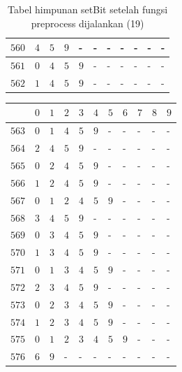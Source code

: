 \begin{appendices}
\begin{table}[H]
\begin{tabular} {|l|l|l|l|l|l|l|l|l|l|l|}
  		$ 560 $ & $ 4 $ &$ 5 $ &$ 9 $ & - &  - &  - &  - &  - &  - &  -   \\ \hline
  		$ 561 $ & $ 0 $ &$ 4 $ &$ 5 $ &$ 9 $ & - &  - &  - &  - &  - &  -   \\ \hline
  		$ 562 $ & $ 1 $ &$ 4 $ &$ 5 $ &$ 9 $ & - &  - &  - &  - &  - &  -   \\ \hline  		
  	\end{tabular}\caption{Tabel himpunan setBit setelah fungsi preprocess dijalankan (19)}
  	\label{tab:setbit_19}
  \end{table}
  \begin{table}[H]
  	\centering
  	\begin{tabular} {|l|l|l|l|l|l|l|l|l|l|l|} \hline
  		\backslashbox{$Num$}{$index$} & $ 0 $ & $ 1 $ & $ 2 $ & $ 3 $ & $ 4 $ & $ 5 $ & $ 6 $ & $ 7 $ & $ 8 $ & $ 9 $ \\ \hline
  		$ 563 $ & $ 0 $ &$ 1 $ &$ 4 $ &$ 5 $ &$ 9 $ & - &  - &  - &  - &  -   \\ \hline
  		$ 564 $ & $ 2 $ &$ 4 $ &$ 5 $ &$ 9 $ & - &  - &  - &  - &  - &  -   \\ \hline
  		$ 565 $ & $ 0 $ &$ 2 $ &$ 4 $ &$ 5 $ &$ 9 $ & - &  - &  - &  - &  -   \\ \hline
  		$ 566 $ & $ 1 $ &$ 2 $ &$ 4 $ &$ 5 $ &$ 9 $ & - &  - &  - &  - &  -   \\ \hline
  		$ 567 $ & $ 0 $ &$ 1 $ &$ 2 $ &$ 4 $ &$ 5 $ &$ 9 $ & - &  - &  - &  -   \\ \hline
  		$ 568 $ & $ 3 $ &$ 4 $ &$ 5 $ &$ 9 $ & - &  - &  - &  - &  - &  -   \\ \hline
  		$ 569 $ & $ 0 $ &$ 3 $ &$ 4 $ &$ 5 $ &$ 9 $ & - &  - &  - &  - &  -   \\ \hline
  		$ 570 $ & $ 1 $ &$ 3 $ &$ 4 $ &$ 5 $ &$ 9 $ & - &  - &  - &  - &  -   \\ \hline
  		$ 571 $ & $ 0 $ &$ 1 $ &$ 3 $ &$ 4 $ &$ 5 $ &$ 9 $ & - &  - &  - &  -   \\ \hline
  		$ 572 $ & $ 2 $ &$ 3 $ &$ 4 $ &$ 5 $ &$ 9 $ & - &  - &  - &  - &  -   \\ \hline
  		$ 573 $ & $ 0 $ &$ 2 $ &$ 3 $ &$ 4 $ &$ 5 $ &$ 9 $ & - &  - &  - &  -   \\ \hline
  		$ 574 $ & $ 1 $ &$ 2 $ &$ 3 $ &$ 4 $ &$ 5 $ &$ 9 $ & - &  - &  - &  -   \\ \hline
  		$ 575 $ & $ 0 $ &$ 1 $ &$ 2 $ &$ 3 $ &$ 4 $ &$ 5 $ &$ 9 $ & - &  - &  -   \\ \hline
  		$ 576 $ & $ 6 $ &$ 9 $ & - &  - &  - &  - &  - &  - &  - &  -   \\ \hline

\end{tabular}
\end{table}
\end{appendices}
